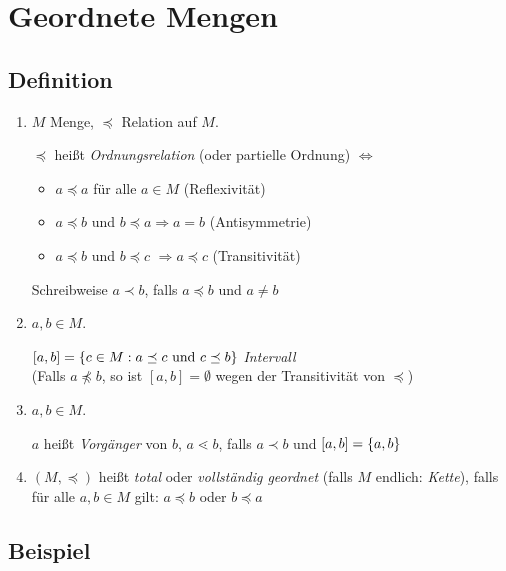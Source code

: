 \section{Geordnete Mengen} %

\subsection{Definition}

\begin{enumerate}
	\item $M$ Menge, $\preceq$ Relation auf $M$.
	
	$\preceq$ heißt \emph{Ordnungsrelation} (oder partielle Ordnung) $\Leftrightarrow$ 
	\begin{itemize}
		\item $a \preceq a$ für alle $a\in M$ (Reflexivität)
		\item $a \preceq b$ und $b \preceq a \Rightarrow a=b$ (Antisymmetrie)
		\item $a \preceq b$ und $b \preceq c$ $\Rightarrow a \preceq c$ (Transitivität)
	\end{itemize}
	
	Schreibweise $a \prec b$, falls $a \preceq b $ und $a \neq b$
	
	\item
	$a, b \in M$. 
	
	$[a, b] = \left\{c \in M : a \preceq c \text{ und } c \preceq b\right\}$ \emph{Intervall}
	\\ (Falls $a \npreceq b$, so ist $[a, b] = \emptyset$ wegen der Transitivität von $\preceq$)

	\item
	$a, b \in M$. 
	
	$a$ heißt \emph{Vorgänger} von $b$, $a\lessdot b$, falls $a \prec b$ und $[a, b] = \left\{a, b\right\}$
	
	\item
	 $(M, \preceq)$ heißt \emph{total} oder \emph{vollständig geordnet} (falls $M$ endlich: \emph{Kette}), falls für alle $a, b \in M$ gilt: $a \preceq b$ oder $b \preceq a$ 
		
\end{enumerate}


\subsection{Beispiel}
 
